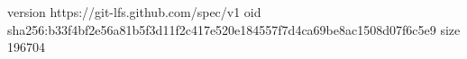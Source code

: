version https://git-lfs.github.com/spec/v1
oid sha256:b33f4bf2e56a81b5f3d11f2c417e520e184557f7d4ca69be8ac1508d07f6c5e9
size 196704
